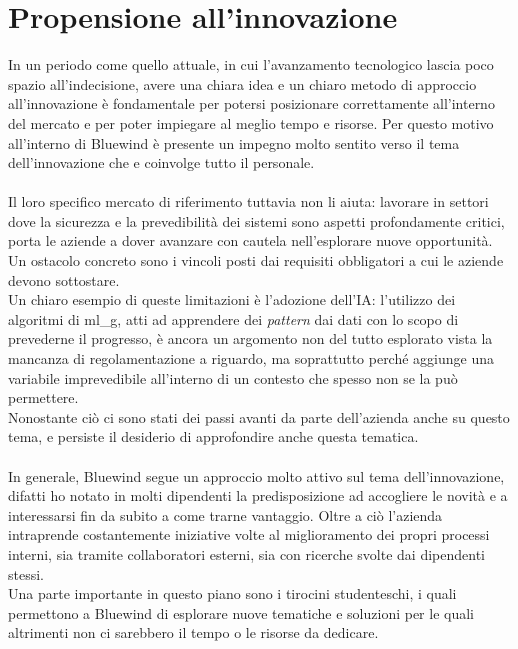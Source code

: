 \section{Propensione all'innovazione} \label{sect:prop-innov}

\noindent
In un periodo come quello attuale, in cui l'avanzamento tecnologico lascia poco spazio all'indecisione, avere una chiara idea e un chiaro metodo di approccio all'innovazione è fondamentale per potersi posizionare correttamente all'interno del mercato e per poter impiegare al meglio tempo e risorse.
Per questo motivo all'interno di Bluewind è presente un impegno molto sentito verso il tema dell'innovazione che e coinvolge tutto il personale.\\\\
Il loro specifico mercato di riferimento tuttavia non li aiuta: lavorare in settori dove la sicurezza e la prevedibilità dei sistemi sono aspetti profondamente critici, porta le aziende a dover avanzare con cautela nell'esplorare nuove opportunità.
Un ostacolo concreto sono i vincoli posti dai requisiti obbligatori a cui le aziende devono sottostare.\\
Un chiaro esempio di queste limitazioni è l'adozione dell'IA: l'utilizzo dei algoritmi di \gls{ml_g}, atti ad apprendere dei \textit{pattern} dai dati con lo scopo di prevederne il progresso, è ancora un argomento non del tutto esplorato vista la mancanza di regolamentazione a riguardo, ma soprattutto perché aggiunge una variabile imprevedibile all'interno di un contesto che spesso non se la può permettere.\\
Nonostante ciò ci sono stati dei passi avanti da parte dell'azienda anche su questo tema, e persiste il desiderio di approfondire anche questa tematica.\\\\
In generale, Bluewind segue un approccio molto attivo sul tema dell'innovazione, difatti ho notato in molti dipendenti la predisposizione ad accogliere le novità e a interessarsi fin da subito a come trarne vantaggio.
Oltre a ciò l'azienda intraprende costantemente iniziative volte al miglioramento dei propri processi interni, sia tramite collaboratori esterni, sia con ricerche svolte dai dipendenti stessi.\\
Una parte importante in questo piano sono i tirocini studenteschi, i quali permettono a Bluewind di esplorare nuove tematiche e soluzioni per le quali altrimenti non ci sarebbero il tempo o le risorse da dedicare.
